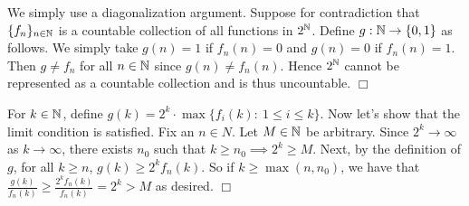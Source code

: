 \documentclass{article}
\begin{document}
 {
    We simply use a diagonalization argument. Suppose for contradiction that $\{f_{n}\}_{n\in \mathbb{N}}$ is a countable collection of all functions in $2^{\mathbb{N}}$. Define $g: \mathbb{N}\to \{0,1\}$ as follows. We simply take $g(n) = 1$ if $f_{n}(n) = 0$ and $g(n) = 0$ if $f_{n}(n) = 1$. Then $g\neq f_{n}$ for all $n\in \mathbb{N}$ since $g(n) \neq f_{n}(n)$. Hence $2^{\mathbb{N}}$ cannot be represented as a countable collection and is thus uncountable. $\Box$
}

 {
    For $k\in \mathbb{N}$, define $g(k) = 2^{k}\cdot\max\{f_{i}(k):\ 1\leq i \leq k\}$. Now let's show that the limit condition is satisfied. Fix an $n\in N$. Let $M\in \mathbb{N}$ be arbitrary. Since $2^{k}\to \infty$ as $k\to\infty$, there exists $n_{0}$ such that $k\geq n_{0}\implies 2^{k}\geq M$. Next, by the definition of $g$, for all $k\geq n$, $g(k) \geq 2^{k}f_{n}(k)$. So if $k\geq \max(n, n_{0})$, we have that $\frac{g(k)}{f_{n}(k)}\geq \frac{2^{k}f_{n}(k)}{f_{n}(k)} = 2^{k} > M$ as desired. $\Box$
}
\end{document}
